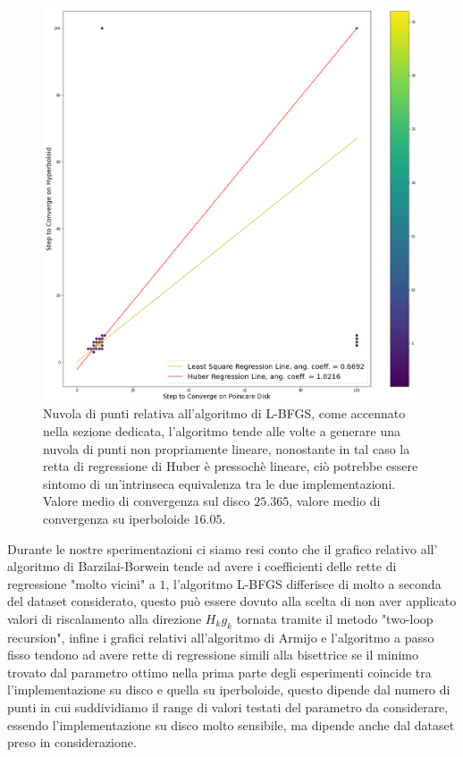 \documentclass[a4paper, 12pt]{article}
\begin{document}
\begin{figure}[H] %
    \centering\includegraphics[width=1\textwidth]{l_bfgs.png}
    \caption{Nuvola di punti relativa all'algoritmo di L-BFGS, come accennato nella sezione dedicata, l'algoritmo tende alle volte a generare una nuvola di punti non propriamente lineare, nonostante in tal caso la retta di regressione di Huber è pressochè lineare, ciò potrebbe essere sintomo di un'intrinseca equivalenza tra le due implementazioni. Valore medio di convergenza sul disco $25.365$, valore medio di convergenza su iperboloide $16.05$.}
\end{figure}
Durante le nostre sperimentazioni ci siamo resi conto che il grafico relativo all' algoritmo di Barzilai-Borwein tende ad avere i coefficienti delle rette di regressione "molto vicini" a $1$, l'algoritmo L-BFGS differisce di molto a seconda del dataset considerato, questo può essere dovuto alla scelta di non aver applicato valori di riscalamento alla direzione $H_kg_k$ tornata tramite il metodo "two-loop recursion", infine i grafici relativi all'algoritmo di Armijo e l'algoritmo a passo fisso tendono ad avere rette di regressione simili alla bisettrice se il minimo trovato dal parametro ottimo nella prima parte degli esperimenti coincide tra l'implementazione su disco e quella su iperboloide, questo dipende dal numero di punti in cui suddividiamo il range di valori testati del parametro da considerare, essendo l'implementazione su disco molto sensibile, ma dipende anche dal dataset preso in considerazione.
\end{document}
